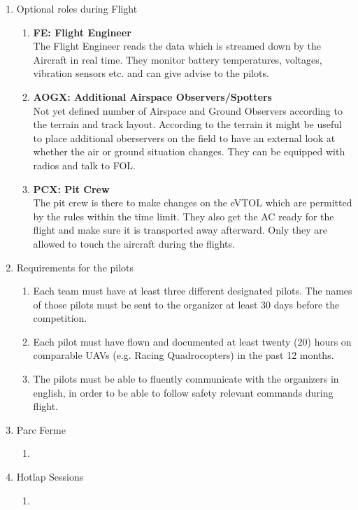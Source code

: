 \begin{enumerate}
    \item{Optional roles during Flight}
    \begin{enumerate}
      \item \textbf{FE: Flight Engineer}\\The Flight Engineer reads the data which is streamed down by the Aircraft in real time. They monitor battery temperatures, voltages, vibration sensors etc. and can give advise to the pilots.
      \item \textbf{AOGX: Additional Airspace Observers/Spotters}\\Not yet defined number of Airspace and Ground Observers according to the terrain and track layout.
      According to the terrain it might be useful to place additional oberservers on the field to have an external look at whether the air or ground situation changes. They can be equipped with radios and talk to FOL.
      \item \textbf{PCX: Pit Crew }\\The pit crew is there to make changes on the eVTOL which are permitted by the rules within the time limit. They also get the AC ready for the flight and make sure it is transported away afterward. Only they are allowed to touch the aircraft during the flights. 
    \end{enumerate}

    \item{Requirements for the pilots}
    \begin{enumerate}
      \item Each team must have at least three different designated pilots. The names of those pilots must be sent to the organizer at least 
      30 days before the competition. 
      \item Each pilot must have flown and documented at least twenty (20) hours on comparable UAVs (e.g. Racing Quadrocopters) in the past 12 months.  
      \item The pilots must be able to fluently communicate with the organizers in english, in order to be able to follow safety relevant commands during flight.
    \end{enumerate}


    \item{Parc Ferme}
    \begin{enumerate}
      \item 
    \end{enumerate}
  
    \item{Hotlap Sessions}
    \begin{enumerate}
      \item 
    \end{enumerate}


\end{enumerate}
